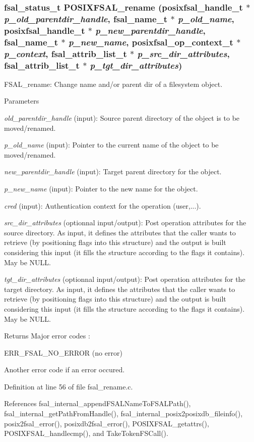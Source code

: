 \subsubsection[{POSIXFSAL\_\-rename}]{\setlength{\rightskip}{0pt plus 5cm}fsal\_\-status\_\-t POSIXFSAL\_\-rename (posixfsal\_\-handle\_\-t $\ast$ {\em p\_\-old\_\-parentdir\_\-handle}, \/  fsal\_\-name\_\-t $\ast$ {\em p\_\-old\_\-name}, \/  posixfsal\_\-handle\_\-t $\ast$ {\em p\_\-new\_\-parentdir\_\-handle}, \/  fsal\_\-name\_\-t $\ast$ {\em p\_\-new\_\-name}, \/  posixfsal\_\-op\_\-context\_\-t $\ast$ {\em p\_\-context}, \/  fsal\_\-attrib\_\-list\_\-t $\ast$ {\em p\_\-src\_\-dir\_\-attributes}, \/  fsal\_\-attrib\_\-list\_\-t $\ast$ {\em p\_\-tgt\_\-dir\_\-attributes})}\label{fsal__rename_8c_a37ab596a65b66e0ca0dd9072208026a0}
FSAL\_\-rename: Change name and/or parent dir of a filesystem object.


\begin{DoxyParams}{Parameters}
\item[{\em old\_\-parentdir\_\-handle}](input): Source parent directory of the object is to be moved/renamed. \item[{\em p\_\-old\_\-name}](input): Pointer to the current name of the object to be moved/renamed. \item[{\em new\_\-parentdir\_\-handle}](input): Target parent directory for the object. \item[{\em p\_\-new\_\-name}](input): Pointer to the new name for the object. \item[{\em cred}](input): Authentication context for the operation (user,...). \item[{\em src\_\-dir\_\-attributes}](optionnal input/output): Post operation attributes for the source directory. As input, it defines the attributes that the caller wants to retrieve (by positioning flags into this structure) and the output is built considering this input (it fills the structure according to the flags it contains). May be NULL. \item[{\em tgt\_\-dir\_\-attributes}](optionnal input/output): Post operation attributes for the target directory. As input, it defines the attributes that the caller wants to retrieve (by positioning flags into this structure) and the output is built considering this input (it fills the structure according to the flags it contains). May be NULL.\end{DoxyParams}
\begin{DoxyReturn}{Returns}
Major error codes :
\begin{DoxyItemize}
\item ERR\_\-FSAL\_\-NO\_\-ERROR (no error)
\item Another error code if an error occured. 
\end{DoxyItemize}
\end{DoxyReturn}


Definition at line 56 of file fsal\_\-rename.c.

References fsal\_\-internal\_\-appendFSALNameToFSALPath(), fsal\_\-internal\_\-getPathFromHandle(), fsal\_\-internal\_\-posix2posixdb\_\-fileinfo(), posix2fsal\_\-error(), posixdb2fsal\_\-error(), POSIXFSAL\_\-getattrs(), POSIXFSAL\_\-handlecmp(), and TakeTokenFSCall().
